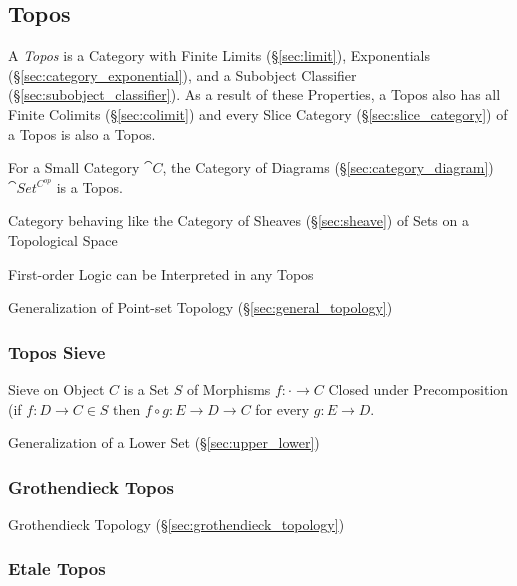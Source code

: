 \subsection{Topos}\label{sec:topos}

A \emph{Topos} is a Category with Finite Limits (\S\ref{sec:limit}),
Exponentials (\S\ref{sec:category_exponential}), and a Subobject
Classifier (\S\ref{sec:subobject_classifier}). As a result of these
Properties, a Topos also has all Finite Colimits (\S\ref{sec:colimit})
and every Slice Category (\S\ref{sec:slice_category}) of a Topos is
also a Topos.

For a Small Category $\cat{C}$, the Category of Diagrams
(\S\ref{sec:category_diagram}) $\cat{Set^{C^{op}}}$ is a
Topos.\cite{awodey06}

Category behaving like the Category of Sheaves (\S\ref{sec:sheave})
of Sets on a Topological Space

First-order Logic can be Interpreted in any Topos

Generalization of Point-set Topology (\S\ref{sec:general_topology})



\subsubsection{Topos Sieve}\label{sec:topos_sieve}

Sieve on Object $C$ is a Set $S$ of Morphisms $f : \cdot \rightarrow
C$ Closed under Precomposition (if $f : D \rightarrow C \in S$ then $f
\circ g : E \rightarrow D \rightarrow C$ for every $g : E \rightarrow
D$.

Generalization of a Lower Set (\S\ref{sec:upper_lower})



\subsubsection{Grothendieck Topos}\label{sec:grothendieck_topos}

Grothendieck Topology (\S\ref{sec:grothendieck_topology})



\subsubsection{Etale Topos}\label{sec:etale_topos}

